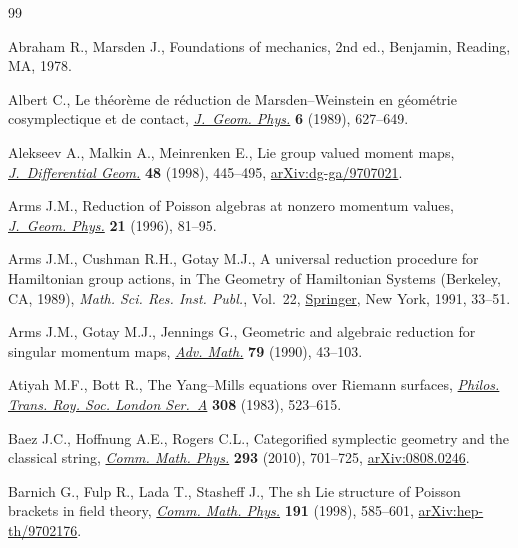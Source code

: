 \documentclass[pdftex]{sigma}
\numberwithin{equation}{section}
\begin{document}
\begin{thebibliography}{99}
\footnotesize\itemsep=0pt

Abraham R., Marsden J., Foundations of mechanics, 2nd ed., Benjamin, Reading,
  MA, 1978.

Albert C., Le th\'eor\`eme de r\'eduction de {M}arsden--{W}einstein en
  g\'eom\'etrie cosymplectique et de contact, \href{https://doi.org/10.1016/0393-0440(89)90029-6}{\textit{J.~Geom. Phys.}}
  \textbf{6} (1989), 627--649.

Alekseev A., Malkin A., Meinrenken E., Lie group valued moment maps,
  \href{https://doi.org/10.4310/jdg/1214460860}{\textit{J.~Differential Geom.}} \textbf{48} (1998), 445--495,
  \href{https://arxiv.org/abs/dg-ga/9707021}{arXiv:dg-ga/9707021}.

Arms J.M., Reduction of {P}oisson algebras at nonzero momentum values,
  \href{https://doi.org/10.1016/S0393-0440(96)00009-5}{\textit{J.~Geom. Phys.}} \textbf{21} (1996), 81--95.

Arms J.M., Cushman R.H., Gotay M.J., A universal reduction procedure for
  {H}amiltonian group actions, in The Geometry of {H}amiltonian Systems
  ({B}erkeley, {CA}, 1989), \textit{Math. Sci. Res. Inst. Publ.}, Vol.~22,
  \href{https://doi.org/10.1007/978-1-4613-9725-0_4}{Springer}, New York, 1991, 33--51.

Arms J.M., Gotay M.J., Jennings G., Geometric and algebraic reduction for
  singular momentum maps, \href{https://doi.org/10.1016/0001-8708(90)90058-U}{\textit{Adv. Math.}} \textbf{79} (1990), 43--103.

Atiyah M.F., Bott R., The {Y}ang--{M}ills equations over {R}iemann surfaces,
  \href{https://doi.org/10.1098/rsta.1983.0017}{\textit{Philos. Trans. Roy. Soc. London Ser.~A}} \textbf{308} (1983),
  523--615.

Baez J.C., Hoffnung A.E., Rogers C.L., Categorified symplectic geometry and the
  classical string, \href{https://doi.org/10.1007/s00220-009-0951-9}{\textit{Comm. Math. Phys.}} \textbf{293} (2010), 701--725,
  \href{https://arxiv.org/abs/0808.0246}{arXiv:0808.0246}.

Barnich G., Fulp R., Lada T., Stasheff J., The sh {L}ie structure of {P}oisson
  brackets in field theory, \href{https://doi.org/10.1007/s002200050278}{\textit{Comm. Math. Phys.}} \textbf{191} (1998),
  585--601, \href{https://arxiv.org/abs/hep-th/9702176}{arXiv:hep-th/9702176}.


\end{thebibliography}
\end{document}
